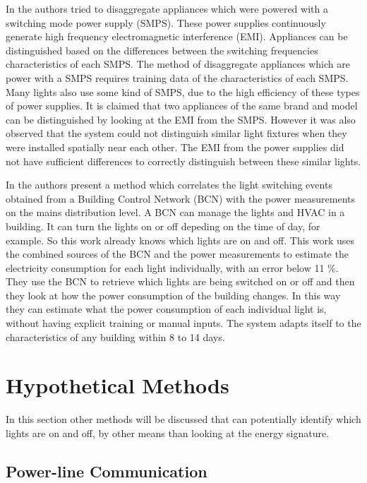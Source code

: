 		In \cite{Gupta:2010} the authors tried to disaggregate appliances which were powered with a switching mode power supply (SMPS).
		These power supplies continuously generate high frequency electromagnetic interference (EMI).
		Appliances can be distinguished based on the differences between the switching frequencies characteristics of each SMPS.
		The method of disaggregate appliances which are power with a SMPS requires training data of the characteristics of each SMPS.  
		Many lights also use some kind of SMPS, due to the high efficiency of these types of power supplies.
		It is claimed that two appliances of the same brand and model can be distinguished by looking at the EMI from the SMPS.
		However it was also observed that the system could not distinguish similar light fixtures when they were installed spatially near each other.
		The EMI from the power supplies did not have sufficient differences to correctly distinguish between these similar lights. 


		In \cite{Englert:2016:LAE:2893711.2893724} the authors present a method which correlates the light switching events obtained from a Building Control Network (BCN) with the power measurements on the mains distribution level.
		A BCN can manage the lights and HVAC in a building.
		It can turn the lights on or off depeding on the time of day, for example.
		So this work already knows which lights are on and off. 
		This work uses the combined sources of the BCN and the power measurements to estimate the electricity consumption for each light individually, with an error below 11 \%.
		They use the BCN to retrieve which lights are being switched on or off and then they look at how the power consumption of the building changes.
		In this way they can estimate what the power consumption of each individual light is, without having explicit training or manual inputs.
		The system adapts itself to the characteristics of any building within 8 to 14 days.



		

	\section{Hypothetical Methods}

		In this section other methods will be discussed that can potentially identify which lights are on and off, by other means than looking at the energy signature.




		\subsection{Power-line Communication}


